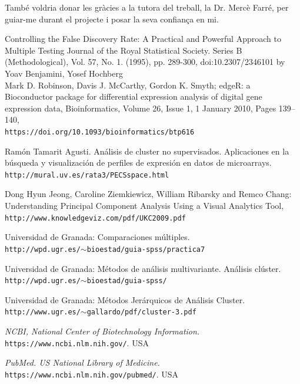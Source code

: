 \documentclass[english]{article}
\begin{document}
També voldria donar les gràcies a la tutora del treball, la Dr. Mercè Farré, per guiar-me durant el projecte i posar la seva confian\c{c}a en mi.
\clearpage
\begin{thebibliography}{aaaa}
Controlling the False Discovery Rate: A Practical and Powerful Approach to Multiple Testing Journal of the Royal Statistical Society. Series B (Methodological), Vol. 57, No. 1. (1995), pp. 289-300, doi:10.2307/2346101 by Yoav Benjamini, Yosef Hochberg\\
Mark D. Robinson, Davis J. McCarthy, Gordon K. Smyth; edgeR: a Bioconductor package for differential expression analysis of digital gene expression data, Bioinformatics, Volume 26, Issue 1, 1 January 2010, Pages 139–140,
\\\texttt{https://doi.org/10.1093/bioinformatics/btp616}

Ramón Tamarit Agusti. Análisis de cluster no supervisados. Aplicaciones en
la búsqueda y visualización de perfiles de expresión
en datos de microarrays.
\\\texttt{http://mural.uv.es/rata3/PECSspace.html}

Dong Hyun Jeong, Caroline Ziemkiewicz, William Ribarsky and Remco Chang: Understanding Principal Component Analysis Using a Visual Analytics Tool,
\\\texttt{http://www.knowledgeviz.com/pdf/UKC2009.pdf}

Universidad de Granada: Comparaciones múltiples.
\\\texttt{http://wpd.ugr.es/$\sim$bioestad/guia-spss/practica7}

Universidad de Granada: Métodos de análisis multivariante. Análisis clúster.
\\\texttt{http://wpd.ugr.es/$\sim$bioestad/guia-spss/}

Universidad de Granada: Métodos Jerárquicos de Análisis Cluster.
\\\texttt{http://www.ugr.es/$\sim$gallardo/pdf/cluster-3.pdf}

\textit{NCBI, National Center of Biotechnology Information.}
\\\texttt{https://www.ncbi.nlm.nih.gov/}. USA

\textit{PubMed. US National Library of Medicine.}
\\\texttt{https://www.ncbi.nlm.nih.gov/pubmed/}. USA

\end{thebibliography}
\clearpage
\appendix
\onecolumn
\end{document}
